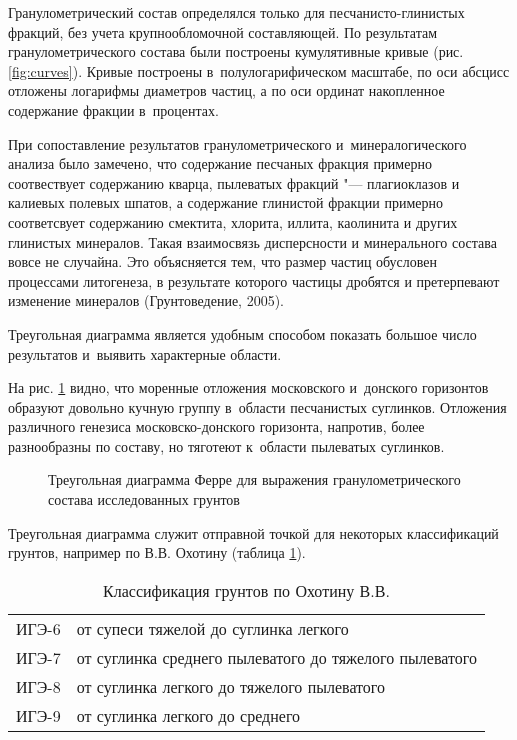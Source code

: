 Гранулометрический состав определялся только для песчанисто-глинистых фракций, без учета крупнообломочной составляющей.
По результатам гранулометрического состава были построены кумулятивные кривые (рис. \ref{fig:curves}).
Кривые построены в~полулогарифическом масштабе, 
по оси абсцисс отложены логарифмы диаметров частиц, 
а по оси ординат накопленное содержание фракции в~процентах.

{
\small

}

При сопоставление результатов гранулометрического и~минералогического анализа было замечено, 
что содержание песчаных фракция примерно соотвествует содержанию кварца, пылеватых фракций "--- плагиоклазов и калиевых полевых шпатов, а содержание глинистой фракции примерно соответсвует содержанию смектита, хлорита, иллита, каолинита и других глинистых минералов.
Такая взаимосвязь дисперсности и минерального состава вовсе не случайна. Это объясняется тем, что размер частиц обусловен процессами литогенеза, в результате которого частицы дробятся и претерпевают изменение минералов (Грунтоведение, 2005)\cite{grunt2005}.

Треугольная диаграмма является удобным способом показать большое число результатов и~выявить характерные области.

На рис. \ref{Fig:Ferre} видно, что моренные отложения московского и~донского горизонтов образуют довольно кучную группу в~области песчанистых суглинков.
Отложения различного генезиса московско-донского горизонта, напротив, более разнообразны по составу, но тяготеют к~области 
пылеватых суглинков.

\begin{figure}[ht]
    \centering
    \small
    
    \caption{Треугольная диаграмма Ферре для выражения гранулометрического состава исследованных грунтов}
    \label{Fig:Ferre}
\end{figure}

Треугольная диаграмма служит отправной точкой для некоторых классификаций грунтов, например по В.\;В. Охотину (таблица \ref{tab:oxot}).

\begin{table}[ht]
    \centering
    \caption{Классификация грунтов по Охотину В.\:В.} \label{tab:oxot}
    \begin{tabular}{cl}
    ИГЭ-6 \dotfill &  от супеси тяжелой до суглинка легкого \\
    ИГЭ-7 \dotfill &  от суглинка среднего пылеватого до тяжелого пылеватого \\
    ИГЭ-8 \dotfill &  от суглинка легкого до тяжелого пылеватого \\
    ИГЭ-9 \dotfill &  от суглинка легкого до среднего \\
    \end{tabular}
\end{table}

